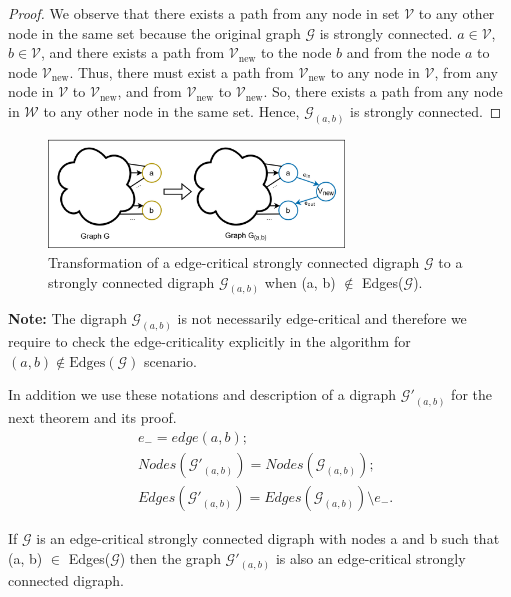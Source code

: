 \documentclass[runningheads]{llncs}
\begin{document}
\begin{proof}
We observe that there exists a path from any node in set $\mathcal{V}$ to any other node in the same set because the original graph $\mathcal{G}$ is strongly connected. $a \in \mathcal{V}$, $b \in \mathcal{V}$, and there exists a path from $\mathcal{V}_{\text{new}}$ to the node $b$ and from the node $a$ to node $\mathcal{V}_{\text{new}}$. Thus, there must exist a path from $\mathcal{V}_{\text{new}}$ to any node in $\mathcal{V}$, from any node in $\mathcal{V}$ to $\mathcal{V}_{\text{new}}$, and from $\mathcal{V}_{\text{new}}$ to $\mathcal{V}_{\text{new}}$. So, there exists a path from any node in $\mathcal{W}$ to any other node in the same set. Hence, $\mathcal{G}_{(a,b)}$ is strongly connected.
\end{proof}

\begin{figure}[ht]
    \centering
    \includegraphics[width=0.7\textwidth]{fig2.png}
    \caption{Transformation of a edge-critical strongly connected digraph $\mathcal{G}$ to a strongly connected digraph $\mathcal{G}_{(a,b)}$ when (a, b) $\notin$ Edges($\mathcal{G}$).}
    \label{fig:fig2}
\end{figure}

\noindent\textbf{Note:} The digraph $\mathcal{G}_{(a,b)}$ is not necessarily edge-critical and therefore we require to check the edge-criticality explicitly in the algorithm for $(a, b) \notin \text{Edges}(\mathcal{G})$ scenario.

\vspace{0.5em}
\noindent In addition we use these notations and description of a digraph $\mathcal{G'}_{(a,b)}$ for the next theorem and its proof.
\begin{align*}
    &e_{-} = edge (a, b); \\
    &Nodes(\mathcal{G'}_{(a,b)}) = Nodes(\mathcal{G}_{(a,b)}); \\
    &Edges(\mathcal{G'}_{(a,b)}) = Edges(\mathcal{G}_{(a,b)}) \setminus e_{-}.
\end{align*}

\begin{theorem}
If $\mathcal{G}$ is an edge-critical strongly connected digraph with nodes a and b such that (a, b) $\in$ Edges($\mathcal{G}$) then the graph $\mathcal{G'}_{(a,b)}$ is also an edge-critical strongly connected digraph.
\end{theorem}
\end{document}

